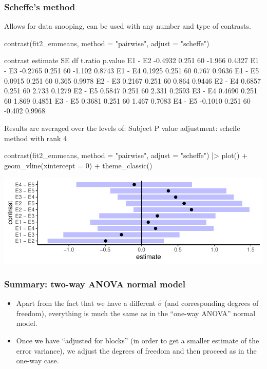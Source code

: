 \documentclass[a4paper]{article}
\begin{document}
\subsubsection{Scheffe's method}
Allows for data snooping, can be used with any number and type of contrasts.
\begin{Schunk}
\begin{Sinput}
contrast(fit2_emmeans, method = "pairwise", adjust = "scheffe")
\end{Sinput}
\begin{Soutput}
 contrast estimate    SE df t.ratio p.value
 E1 - E2   -0.4932 0.251 60  -1.966  0.4327
 E1 - E3   -0.2765 0.251 60  -1.102  0.8743
 E1 - E4    0.1925 0.251 60   0.767  0.9636
 E1 - E5    0.0915 0.251 60   0.365  0.9978
 E2 - E3    0.2167 0.251 60   0.864  0.9446
 E2 - E4    0.6857 0.251 60   2.733  0.1279
 E2 - E5    0.5847 0.251 60   2.331  0.2593
 E3 - E4    0.4690 0.251 60   1.869  0.4851
 E3 - E5    0.3681 0.251 60   1.467  0.7083
 E4 - E5   -0.1010 0.251 60  -0.402  0.9968

Results are averaged over the levels of: Subject 
P value adjustment: scheffe method with rank 4 
\end{Soutput}
\begin{Sinput}
contrast(fit2_emmeans, method = "pairwise", adjust = "scheffe") |> 
  plot() + geom_vline(xintercept = 0) +
  theme_classic()
\end{Sinput}


{\centering \includegraphics[width=\maxwidth]{figure/listings-unnamed-chunk-296-1} 

}

\end{Schunk}
\subsubsection{Summary: two-way ANOVA normal model}
\begin{itemize}
	\item Apart from the fact that we have a different \( \hat{\sigma} \) (and corresponding degrees of freedom), everything is much the same as in the ``one-way ANOVA'' normal model.
	\item Once we have ``adjusted for blocks'' (in order to get a smaller estimate of the error variance), we adjust the degrees of freedom and then proceed as in the one-way case.
\end{itemize}
\end{document}
